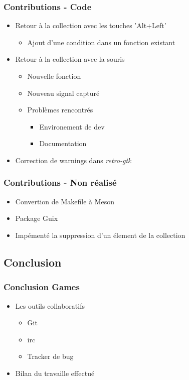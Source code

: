 \documentclass{beamer}
\begin{document}
\begin{frame}
  \frametitle{Contributions - Code}
  \begin{itemize}
  \item Retour à la collection avec les touches 'Alt+Left'
    \begin{itemize}
    \item Ajout d'une condition dans un fonction existant
    \end{itemize}
  \item Retour à la collection avec la souris
    \begin{itemize}
    \item Nouvelle fonction
    \item Nouveau signal capturé
    \item Problèmes rencontrés
      \begin{itemize}
      \item Environement de dev
      \item Documentation
      \end{itemize}
    \end{itemize}
  \item Correction de warnings dans \textit{retro-gtk}
  \end{itemize}
\end{frame}

\begin{frame}
  \frametitle{Contributions - Non réalisé}
  \begin{itemize}
  \item Convertion de Makefile à Meson
  \item Package Guix
  \item Impémenté la suppression d'un élement de la collection
  \end{itemize}
\end{frame}


\subsection{Conclusion}
\begin{frame}
  \frametitle{Conclusion Games}
  \begin{itemize}
  \item Les outils collaboratifs
    \begin{itemize}
    \item Git 
    \item irc 
    \item Tracker de bug
    \end{itemize}
  \item Bilan du travaille effectué
  \end{itemize}
\end{frame}
\end{document}
